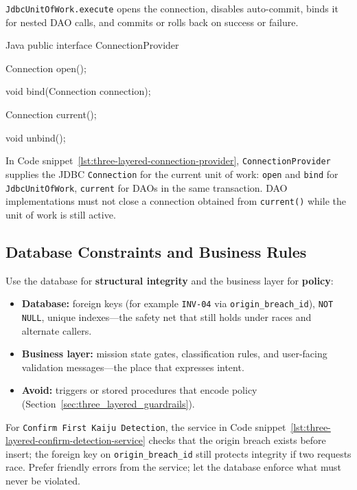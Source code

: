\texttt{JdbcUnitOfWork.execute} opens the connection, disables auto-commit, binds it for nested DAO calls, and commits or rolls back on success or failure.

\begin{ridercode}{Java}
public interface ConnectionProvider
{

    Connection open();

    void bind(Connection connection);

    Connection current();

    void unbind();

}
\end{ridercode}
\label{lst:three-layered-connection-provider}

In Code snippet~\ref{lst:three-layered-connection-provider}, \texttt{ConnectionProvider} supplies the JDBC \texttt{Connection} for the current unit of work: \texttt{open} and \texttt{bind} for \texttt{JdbcUnitOfWork}, \texttt{current} for DAOs in the same transaction. DAO implementations must not close a connection obtained from \texttt{current()} while the unit of work is still active.

\subsection{Database Constraints and Business Rules}
\label{sec:three_layered_db_constraints}

Use the database for \textbf{structural integrity} and the business layer for \textbf{policy}:
\begin{itemize}
    \item \textbf{Database:} foreign keys (for example \texttt{INV-04} via \texttt{origin\_breach\_id}), \texttt{NOT NULL}, unique indexes---the safety net that still holds under races and alternate callers.
    \item \textbf{Business layer:} mission state gates, classification rules, and user-facing validation messages---the place that expresses intent.
    \item \textbf{Avoid:} triggers or stored procedures that encode policy (Section~\ref{sec:three_layered_guardrails}).
\end{itemize}

For \texttt{Confirm First Kaiju Detection}, the service in Code snippet~\ref{lst:three-layered-confirm-detection-service} checks that the origin breach exists before insert; the foreign key on \texttt{origin\_breach\_id} still protects integrity if two requests race. Prefer friendly errors from the service; let the database enforce what must never be violated.

